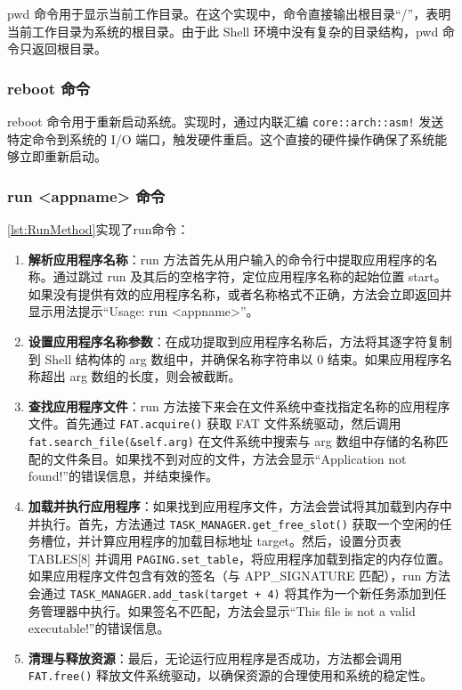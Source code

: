 pwd 命令用于显示当前工作目录。在这个实现中，命令直接输出根目录“/”，表明当前工作目录为系统的根目录。由于此 Shell 环境中没有复杂的目录结构，pwd 命令只返回根目录。

\subsubsection{reboot 命令}

reboot 命令用于重新启动系统。实现时，通过内联汇编 \texttt{core::arch::asm!} 发送特定命令到系统的 I/O 端口，触发硬件重启。这个直接的硬件操作确保了系统能够立即重新启动。

\subsubsection{run <appname> 命令}\label{sec:RunCommand}

\cref{lst:RunMethod}实现了run命令：

\begin{enumerate}
    \item \textbf{解析应用程序名称}：run 方法首先从用户输入的命令行中提取应用程序的名称。通过跳过 run 及其后的空格字符，定位应用程序名称的起始位置 start。如果没有提供有效的应用程序名称，或者名称格式不正确，方法会立即返回并显示用法提示“Usage: run <appname>”。
    \item \textbf{设置应用程序名称参数}：在成功提取到应用程序名称后，方法将其逐字符复制到 Shell 结构体的 arg 数组中，并确保名称字符串以 0 结束。如果应用程序名称超出 arg 数组的长度，则会被截断。
    \item \textbf{查找应用程序文件}：run 方法接下来会在文件系统中查找指定名称的应用程序文件。首先通过 \texttt{FAT.acquire()} 获取 FAT 文件系统驱动，然后调用 \texttt{fat.search\_file(\&self.arg)} 在文件系统中搜索与 arg 数组中存储的名称匹配的文件条目。如果找不到对应的文件，方法会显示“Application not found!”的错误信息，并结束操作。
    \item \textbf{加载并执行应用程序}：如果找到应用程序文件，方法会尝试将其加载到内存中并执行。首先，方法通过 \texttt{TASK\_MANAGER.get\_free\_slot()} 获取一个空闲的任务槽位，并计算应用程序的加载目标地址 target。然后，设置分页表 TABLES[8] 并调用 \texttt{PAGING.set\_table}，将应用程序加载到指定的内存位置。如果应用程序文件包含有效的签名（与 APP\_SIGNATURE 匹配），run 方法会通过 \texttt{TASK\_MANAGER.add\_task(target + 4)} 将其作为一个新任务添加到任务管理器中执行。如果签名不匹配，方法会显示“This file is not a valid executable!”的错误信息。
    \item \textbf{清理与释放资源}：最后，无论运行应用程序是否成功，方法都会调用 \texttt{FAT.free()} 释放文件系统驱动，以确保资源的合理使用和系统的稳定性。
\end{enumerate}

